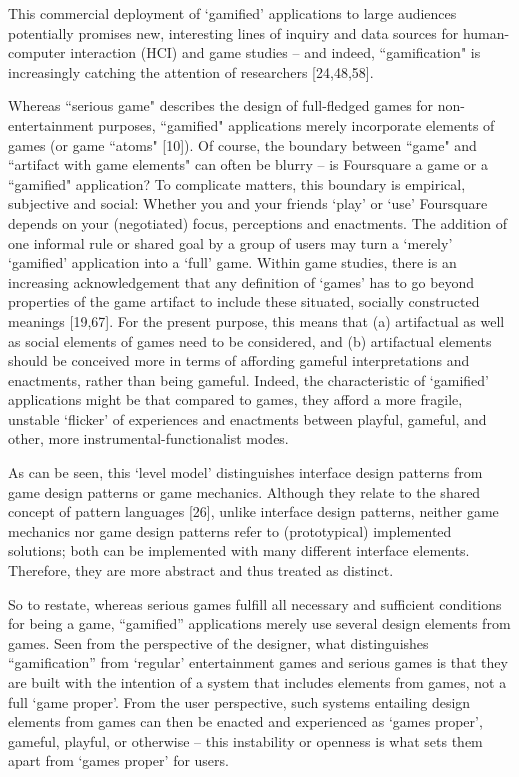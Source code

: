 This commercial deployment of `gamified' applications to large audiences potentially promises new, interesting lines of inquiry and data sources for human-computer interaction (HCI) and game studies – and indeed, ``gamification" is increasingly catching the attention of researchers [24,48,58].

Whereas ``serious game" describes the design of full-fledged games for non-entertainment purposes, ``gamified" applications merely incorporate elements of games (or game ``atoms" [10]). Of course, the boundary between ``game" and ``artifact with game elements" can often be blurry – is Foursquare a game or a ``gamified" application? To complicate matters, this boundary is empirical, subjective and social: Whether you and your friends `play' or `use' Foursquare depends on your (negotiated) focus, perceptions and enactments. The addition of one informal rule or shared goal by a group of users may turn a `merely' `gamified' application into a `full' game. Within game studies, there is an increasing acknowledgement that any definition of `games' has to go beyond properties of the game artifact to include these situated, socially constructed meanings [19,67]. For the present purpose, this means that (a) artifactual as well as social elements of games need to be considered, and (b) artifactual elements should be conceived more in terms of affording gameful interpretations and enactments, rather than being gameful. Indeed, the characteristic of `gamified' applications might be that compared to games, they afford a more fragile, unstable `flicker' of experiences and enactments between playful, gameful, and other, more instrumental-functionalist modes.


As can be seen, this ‘level model’ distinguishes interface design patterns from game design patterns or game mechanics. Although they relate to the shared concept of pattern languages [26], unlike interface design patterns, neither game mechanics nor game design patterns refer to (prototypical) implemented solutions; both can be implemented with many different interface elements. Therefore, they are more abstract and thus treated as distinct.

So to restate, whereas serious games fulfill all necessary and sufficient conditions for being a game, “gamified” applications merely use several design elements from games. Seen from the perspective of the designer, what distinguishes “gamification” from ‘regular’ entertainment games and serious games is that they are built with the intention of a system that includes elements from games, not a full ‘game proper’. From the user perspective, such systems entailing design elements from games can then be enacted and experienced as ‘games proper’, gameful, playful, or otherwise – this instability or openness is what sets them apart from ‘games proper’ for users.

